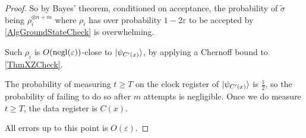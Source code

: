 \begin{proof}
	So by Bayes' theorem, conditioned on acceptance, the probability of $\tilde{\sigma}$ being $\rho_i^{\otimes n+m}$ where $\rho_i$ has over probability $1-2\varepsilon$ to be accepted by \autoref{AlgGroundStateCheck} is overwhelming.

	Such $\rho_i$ is $O(\operatorname{negl}(\varepsilon))$-close to $\ket{\psi_{C'(x)}}$, by applying a Chernoff bound to \autoref{ThmXZCheck}.

	The probability of measuring $t\geq T$ on the clock register of $\ket{\psi_{C'(x)}}$ is $\frac{1}{2}$, so the probability of failing to do so after $m$ attempts is negligible.
	Once we do measure $t\geq T$, the data register is $C(x)$.

	All errors up to this point is $O(\varepsilon)$.
\end{proof}

